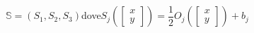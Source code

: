 \documentclass[preview]{standalone}
\newcommand{\XY}{\begin{bmatrix}x\\y\end{bmatrix}}
\newcommand{\bXY}{\left(\XY\right)}
\begin{document}
\begin{center}
$\mathbb{S}=(S_1,S_2,S_3)$\hspace{10pt}dove\hspace{10pt}$S_j\bXY=\dfrac{1}{2}O_j\bXY+b_j$
\end{center}
\end{document}
